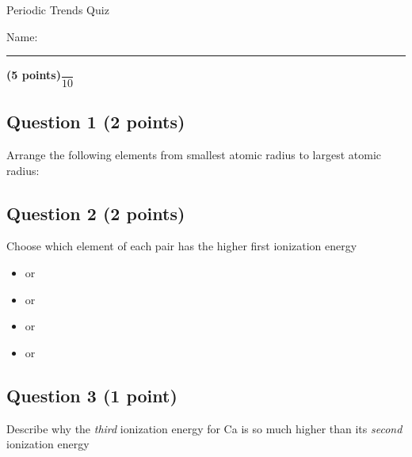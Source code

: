 \documentclass[12pt, letterpaper]{memoir}
\begin{document}
	\begin{center}
		{\large Periodic Trends Quiz}
	\end{center}
	{\large Name: \rule[-1mm]{4in}{.1pt} {\bfseries (5 points)}\hspace{4em}$\dfrac{~}{10}$} 
	
	\subsection*{Question 1 (2 points)}
	Arrange the following elements from smallest atomic radius to largest atomic radius:
	
	 \hspace{2em}  \hspace{2em}  \hspace{2em}  \hspace{2em}  \hspace{2em} 
	
	\vspace{8em}
	\subsection*{Question 2 (2 points)}
	Choose which element of each pair has the higher first ionization energy
	
	\begin{itemize}
		\item {} or 
		\item \vspace{0.5em} or 
		\item \vspace{0.5em} or 
		\item \vspace{0.5em} or 
	\end{itemize}
	
	\vspace{0.25em}
	\subsection*{Question 3 (1 point)}
	Describe why the \emph{third} ionization energy for Ca is so much higher than its \emph{second} ionization energy
\end{document}
